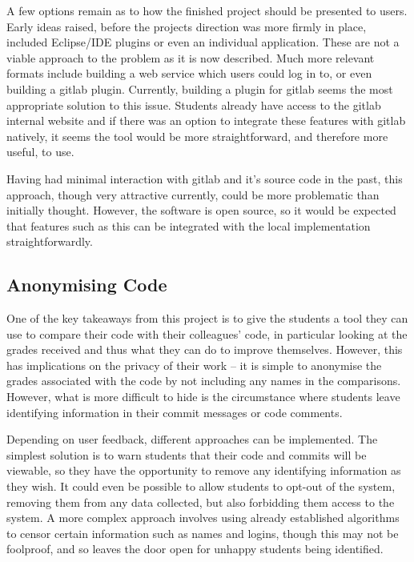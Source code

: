 A few options remain as to how the finished project should be presented to users.
Early ideas raised, before the projects direction was more firmly in place,
included Eclipse/IDE plugins or even an individual application. These are not a
viable approach to the problem as it is now described. Much more relevant formats
include building a web service which users could log in to, or even building a
gitlab plugin. Currently, building a plugin for gitlab seems the most appropriate
solution to this issue. Students already have access to the gitlab internal website
and if there was an option to integrate these features with gitlab natively, it
seems the tool would be more straightforward, and therefore more useful, to use.

Having had minimal interaction with gitlab and it's source code in the past, this
approach, though very attractive currently, could be more problematic than 
initially thought. However, the software is open source, so it would be expected
that features such as this can be integrated with the local implementation
straightforwardly.

\subsection{Anonymising Code}

One of the key takeaways from this project is to give the students a tool
they can use to compare their code with their colleagues' code, in particular
looking at the grades received and thus what they can do to improve themselves.
However, this has implications on the privacy of their work -- it is simple to
anonymise the grades associated with the code by not including any names in
the comparisons. However, what is more difficult to hide is the circumstance where
students leave identifying information in their commit messages or code comments.

Depending on user feedback, different approaches can be implemented. The simplest
solution is to warn students that their code and commits will be viewable, so
they have the opportunity to remove any identifying information as they wish. It
could even be possible to allow students to opt-out of the system, removing them
from any data collected, but also forbidding them access to the system. A more
complex approach involves using already established algorithms to censor certain
information such as names and logins, though this may not be foolproof, and so
leaves the door open for unhappy students being identified.

